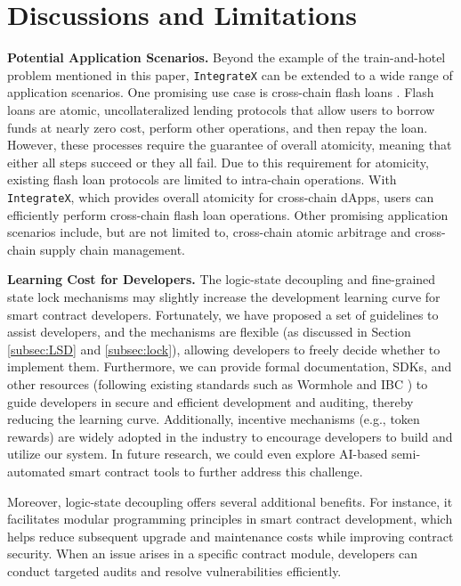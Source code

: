 \section{Discussions and Limitations}\label{disscussion}

\noindent
\textbf{Potential Application Scenarios.} 
Beyond the example of the train-and-hotel problem mentioned in this paper, \texttt{IntegrateX} can be extended to a wide range of application scenarios. 
One promising use case is cross-chain flash loans \cite{tefagh2021ccfl}. 
Flash loans are atomic, uncollateralized lending protocols that allow users to borrow funds at nearly zero cost, perform other operations, and then repay the loan. 
However, these processes require the guarantee of overall atomicity, meaning that either all steps succeed or they all fail. 
Due to this requirement for atomicity, existing flash loan protocols are limited to intra-chain operations. 
With \texttt{IntegrateX}, which provides overall atomicity for cross-chain dApps, users can efficiently perform cross-chain flash loan operations.
Other promising application scenarios include, but are not limited to, cross-chain atomic arbitrage and cross-chain supply chain management.

\vspace{3pt}
\noindent
\textbf{Learning Cost for Developers.} 
The logic-state decoupling and fine-grained state lock mechanisms may slightly increase the development learning curve for smart contract developers. Fortunately, we have proposed a set of guidelines to assist developers, and the mechanisms are flexible (as discussed in Section \ref{subsec:LSD} and \ref{subsec:lock}), allowing developers to freely decide whether to implement them. Furthermore, we can provide formal documentation, SDKs, and other resources (following existing standards such as Wormhole \cite{wormhole} and IBC \cite{cosmos2019}) to guide developers in secure and efficient development and auditing, thereby reducing the learning curve. Additionally, incentive mechanisms (e.g., token rewards) are widely adopted in the industry to encourage developers to build and utilize our system. In future research, we could even explore AI-based semi-automated smart contract tools to further address this challenge.

Moreover, logic-state decoupling offers several additional benefits. For instance, it facilitates modular programming principles in smart contract development, which helps reduce subsequent upgrade and maintenance costs while improving contract security. When an issue arises in a specific contract module, developers can conduct targeted audits and resolve vulnerabilities efficiently. 


